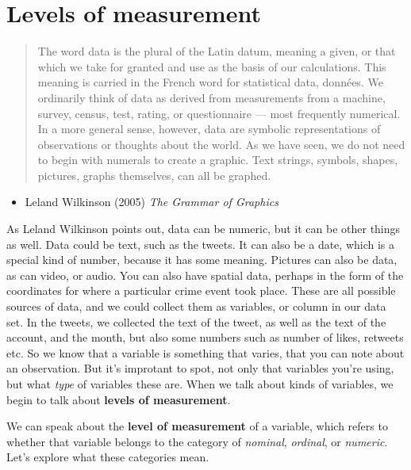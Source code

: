 \documentclass[]{book}
\providecommand{\tightlist}{%
  \setlength{\itemsep}{0pt}\setlength{\parskip}{0pt}}
\theoremstyle{definition}
\theoremstyle{definition}
\theoremstyle{definition}
\theoremstyle{remark}
\begin{document}
\hypertarget{levels-of-measurement}{%
\section{Levels of measurement}\label{levels-of-measurement}}

\begin{quote}
The word data is the plural of the Latin datum, meaning a given, or that
which we take for granted and use as the basis of our calculations. This
meaning is carried in the French word for statistical data, données. We
ordinarily think of data as derived from measurements from a machine,
survey, census, test, rating, or questionnaire --- most frequently
numerical. In a more general sense, however, data are symbolic
representations of observations or thoughts about the world. As we have
seen, we do not need to begin with numerals to create a graphic. Text
strings, symbols, shapes, pictures, graphs themselves, can all be
graphed.
\end{quote}

\begin{itemize}
\tightlist
\item
  Leland Wilkinson (2005) \emph{The Grammar of Graphics}
\end{itemize}

As Leland Wilkinson points out, data can be numeric, but it can be other
things as well. Data could be text, such as the tweets. It can also be a
date, which is a special kind of number, because it has some meaning.
Pictures can also be data, as can video, or audio. You can also have
spatial data, perhaps in the form of the coordinates for where a
particular crime event took place. These are all possible sources of
data, and we could collect them as variables, or column in our data set.
In the tweets, we collected the text of the tweet, as well as the text
of the account, and the month, but also some numbers such as number of
likes, retweets etc. So we know that a variable is something that
varies, that you can note about an observation. But it's improtant to
spot, not only that variables you're using, but what \emph{type} of
variables these are. When we talk about kinds of variables, we begin to
talk about \textbf{levels of measurement}.

We can speak about the \textbf{level of measurement} of a variable,
which refers to whether that variable belongs to the category of
\emph{nominal}, \emph{ordinal}, or \emph{numeric}. Let's explore what
these categories mean.
\end{document}
